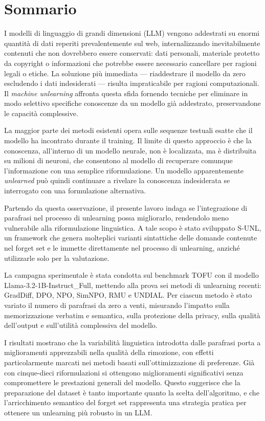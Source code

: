 \chapter*{Sommario}

I modelli di linguaggio di grandi dimensioni (LLM) vengono addestrati su enormi quantità di dati reperiti prevalentemente sul web, internalizzando inevitabilmente contenuti che non dovrebbero essere conservati: dati personali, materiale protetto da copyright o informazioni che potrebbe essere necessario cancellare per ragioni legali o etiche. La soluzione più immediata — riaddestrare il modello da zero escludendo i dati indesiderati — risulta impraticabile per ragioni computazionali. Il \emph{machine unlearning} affronta questa sfida fornendo tecniche per eliminare in modo selettivo specifiche conoscenze da un modello già addestrato, preservandone le capacità complessive.

La maggior parte dei metodi esistenti opera sulle sequenze testuali esatte che il modello ha incontrato durante il training. Il limite di questo approccio è che la conoscenza, all'interno di un modello neurale, non è localizzata, ma è distribuita su milioni di neuroni, che consentono al modello di recuperare comunque l'informazione con una semplice riformulazione. Un modello apparentemente \textit{unlearned} può quindi continuare a rivelare la conoscenza indesiderata se interrogato con una formulazione alternativa.

Partendo da questa osservazione, il presente lavoro indaga se l'integrazione di parafrasi nel processo di unlearning possa migliorarlo, rendendolo meno vulnerabile alla riformulazione linguistica. A tale scopo è stato sviluppato S-UNL, un framework che genera molteplici varianti sintattiche delle domande contenute nel forget set e le immette direttamente nel processo di unlearning, anziché utilizzarle solo per la valutazione.

La campagna sperimentale è stata condotta sul benchmark TOFU con il modello Llama-3.2-1B-Instruct\_Full, mettendo alla prova sei metodi di unlearning recenti: GradDiff, DPO, NPO, SimNPO, RMU e UNDIAL. Per ciascun metodo è stato variato il numero di parafrasi da zero a venti, misurando l'impatto sulla memorizzazione verbatim e semantica, sulla protezione della privacy, sulla qualità dell'output e sull'utilità complessiva del modello.

I risultati mostrano che la variabilità linguistica introdotta dalle parafrasi porta a miglioramenti apprezzabili nella qualità della rimozione, con effetti particolarmente marcati nei metodi basati sull'ottimizzazione di preferenze. Già con cinque-dieci riformulazioni si ottengono miglioramenti significativi senza compromettere le prestazioni generali del modello. Questo suggerisce che la preparazione del dataset è tanto importante quanto la scelta dell'algoritmo, e che l'arricchimento semantico del forget set rappresenta una strategia pratica per ottenere un unlearning più robusto in un LLM.

